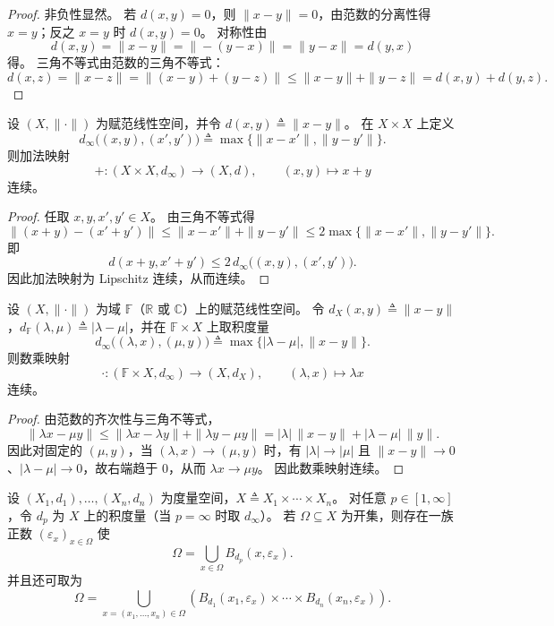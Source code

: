 \documentclass[lang=cn,a4paper,newtx,section]{elegantbook}
\begin{document}
\begin{proof}
  非负性显然。
  若 $d(x,y)=0$，则 $\|x-y\|=0$，由范数的分离性得 $x=y$；反之 $x=y$ 时 $d(x,y)=0$。
  对称性由
  \[
    d(x,y)=\|x-y\|=\|-(y-x)\|=\|y-x\|=d(y,x)
  \]
  得。
  三角不等式由范数的三角不等式：
  \[
    d(x,z)=\|x-z\|=\|(x-y)+(y-z)\|\le\|x-y\|+\|y-z\|=d(x,y)+d(y,z).
  \]
\end{proof}

\begin{proposition}\label{prop:addition-continuous-normed}
  设 $(X,\|\cdot\|)$ 为赋范线性空间，并令 $d(x,y)\triangleq\|x-y\|$。
  在 $X\times X$ 上定义
  \[
    d_\infty\bigl((x,y),(x',y')\bigr)\triangleq\max\{\|x-x'\|,\|y-y'\|\}.
  \]
  则加法映射
  \[
    +:(X\times X,d_\infty)\to (X,d),\qquad (x,y)\mapsto x+y
  \]
  连续。
\end{proposition}

\begin{proof}
  任取 $x,y,x',y'\in X$。
  由三角不等式得
  \[
    \|(x+y)-(x'+y')\|\le\|x-x'\|+\|y-y'\|\le 2\max\{\|x-x'\|,\|y-y'\|\}.
  \]
  即
  \[
    d(x+y,x'+y')\le 2\,d_\infty\bigl((x,y),(x',y')\bigr).
  \]
  因此加法映射为 Lipschitz 连续，从而连续。
\end{proof}

\begin{proposition}\label{prop:scalar-multiplication-continuous-normed}
  设 $(X,\|\cdot\|)$ 为域 $\mathbb{F}$（$\mathbb{R}$ 或 $\mathbb{C}$）上的赋范线性空间。
  令 $d_X(x,y)\triangleq\|x-y\|$，$d_{\mathbb{F}}(\lambda,\mu)\triangleq|\lambda-\mu|$，并在 $\mathbb{F}\times X$ 上取积度量
  \[
    d_\infty\bigl((\lambda,x),(\mu,y)\bigr)\triangleq\max\{|\lambda-\mu|,\|x-y\|\}.
  \]
  则数乘映射
  \[
    \cdot:(\mathbb{F}\times X,d_\infty)\to (X,d_X),\qquad (\lambda,x)\mapsto \lambda x
  \]
  连续。
\end{proposition}

\begin{proof}
  由范数的齐次性与三角不等式，
  \[
    \|\lambda x-\mu y\|\le\|\lambda x-\lambda y\|+\|\lambda y-\mu y\|
    =|\lambda|\,\|x-y\|+|\lambda-\mu|\,\|y\|.
  \]
  因此对固定的 $(\mu,y)$，当 $(\lambda,x)\to(\mu,y)$ 时，有 $|\lambda|\to|\mu|$ 且 $\|x-y\|\to0$、$|\lambda-\mu|\to0$，故右端趋于 $0$，从而 $\lambda x\to\mu y$。
  因此数乘映射连续。
\end{proof}

\begin{proposition}\label{prop:finite-product-open-sets}
  设 $(X_1,d_1),\dots,(X_n,d_n)$ 为度量空间，$X\triangleq X_1\times\cdots\times X_n$。
  对任意 $p\in[1,\infty]$，令 $d_p$ 为 $X$ 上的积度量（当 $p=\infty$ 时取 $d_\infty$）。
  若 $\Omega\subseteq X$ 为开集，则存在一族正数 $(\varepsilon_x)_{x\in\Omega}$ 使
  \[
    \Omega=\bigcup_{x\in\Omega}B_{d_p}(x,\varepsilon_x).
  \]
  并且还可取为
  \[
    \Omega=\bigcup_{x=(x_1,\dots,x_n)\in\Omega}\left(B_{d_1}(x_1,\varepsilon_x)\times\cdots\times B_{d_n}(x_n,\varepsilon_x)\right).
  \]
\end{proposition}
\end{document}
